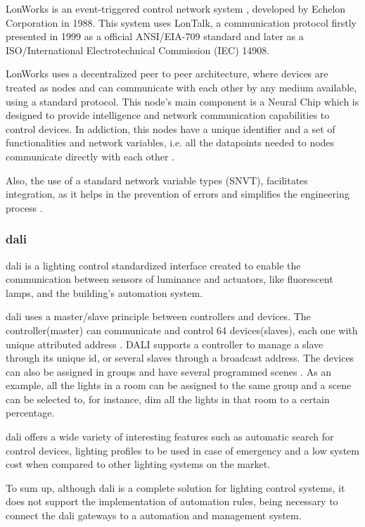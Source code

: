 LonWorks is an event-triggered control network system \cite{Osorio}, developed by Echelon Corporation \cite{echelon} in 1988. This system uses LonTalk, a communication protocol firstly presented in 1999 as a official ANSI/EIA-709 standard and later as a ISO/International Electrotechnical Commission (IEC) 14908.

LonWorks uses a decentralized peer to peer architecture, where devices are treated as nodes and can communicate with each other by any medium available, using a standard protocol. This node's main component is a Neural Chip which is designed to provide intelligence and network communication capabilities to control devices. In addiction, this nodes have a unique identifier and a set of functionalities and network variables, i.e. all the datapoints needed to nodes communicate directly with each other \cite{Domingues2016}.

Also, the use of a standard network variable types (SNVT), facilitates integration, as it helps in the prevention of errors and simplifies the engineering process \cite{Siemens2013}. 


\subsubsection{\acf{dali}}
\acf{dali} is a lighting control standardized interface created to enable the communication between sensors of luminance and actuators, like fluorescent lamps, and the building's automation system.

\ac{dali} uses a master/slave principle between controllers and devices. The controller(master) can communicate and control 64 devices(slaves), each one with unique attributed address \cite{Ma2014}. DALI supports a controller to manage a slave through its unique id, or several slaves through a broadcast address. The devices can also be assigned in groups and have several programmed scenes \cite{Ma2014}. As an example, all the lights in a room can be assigned to the same group and a scene can be selected to, for instance, dim all the lights in that room to a certain percentage. 

\ac{dali} offers a wide variety of interesting features such as automatic search for control devices, lighting profiles to be used in case of emergency and a low system cost when compared to other lighting systems on the market\cite{Zhang2006}.

To sum up, although \ac{dali} is a complete solution for lighting control systems, it does not support the implementation of automation rules, being necessary to connect the \ac{dali} gateways to a automation and management system.

